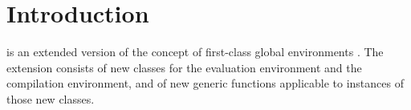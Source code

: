\chapter{Introduction}

\sysname{} is an extended version of the concept of first-class global
environments \cite{Strandh:2015:ELS:Environments}.  The extension
consists of new classes for the evaluation environment and the
compilation environment, and of new generic functions applicable to
instances of those new classes.
